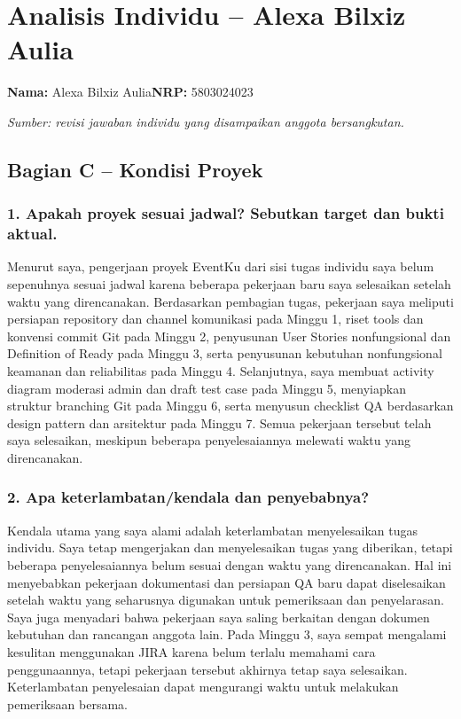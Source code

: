 \documentclass[11pt,a4paper]{article}
\newcommand{\page}[1]{\clearpage\section{#1}}
\begin{document}
\page{Analisis Individu -- Alexa Bilxiz Aulia}
\textbf{Nama:} Alexa Bilxiz Aulia\quad\textbf{NRP:} 5803024023

\textit{Sumber: revisi jawaban individu yang disampaikan anggota bersangkutan.} \cite{alexaind}

\begingroup
\setlength{\parskip}{4pt}
\subsection*{Bagian C -- Kondisi Proyek}
\subsubsection*{1. Apakah proyek sesuai jadwal? Sebutkan target dan bukti aktual.}

Menurut saya, pengerjaan proyek EventKu dari sisi tugas individu saya belum sepenuhnya sesuai jadwal karena beberapa pekerjaan baru saya selesaikan setelah waktu yang direncanakan. Berdasarkan pembagian tugas, pekerjaan saya meliputi persiapan repository dan channel komunikasi pada Minggu 1, riset tools dan konvensi commit Git pada Minggu 2, penyusunan User Stories nonfungsional dan Definition of Ready pada Minggu 3, serta penyusunan kebutuhan nonfungsional keamanan dan reliabilitas pada Minggu 4. Selanjutnya, saya membuat activity diagram moderasi admin dan draft test case pada Minggu 5, menyiapkan struktur branching Git pada Minggu 6, serta menyusun checklist QA berdasarkan design pattern dan arsitektur pada Minggu 7. Semua pekerjaan tersebut telah saya selesaikan, meskipun beberapa penyelesaiannya melewati waktu yang direncanakan.

\subsubsection*{2. Apa keterlambatan/kendala dan penyebabnya?}

Kendala utama yang saya alami adalah keterlambatan menyelesaikan tugas individu. Saya tetap mengerjakan dan menyelesaikan tugas yang diberikan, tetapi beberapa penyelesaiannya belum sesuai dengan waktu yang direncanakan. Hal ini menyebabkan pekerjaan dokumentasi dan persiapan QA baru dapat diselesaikan setelah waktu yang seharusnya digunakan untuk pemeriksaan dan penyelarasan. Saya juga menyadari bahwa pekerjaan saya saling berkaitan dengan dokumen kebutuhan dan rancangan anggota lain. Pada Minggu 3, saya sempat mengalami kesulitan menggunakan JIRA karena belum terlalu memahami cara penggunaannya, tetapi pekerjaan tersebut akhirnya tetap saya selesaikan. Keterlambatan penyelesaian dapat mengurangi waktu untuk melakukan pemeriksaan bersama.
\end{document}
